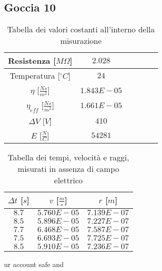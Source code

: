 \documentclass{article}
\begin{document}
\subsection{Goccia 10}
\begin{multicols}{2}

\begin{table}[H]
	\centering
	\begin{tabular}{| c | c | c | c | c | c |}
		\hline
		Resistenza [$M\Omega$] & $2.028$\\
		\hline
		Temperatura [$^\circ C$]& $24$\\
		\hline
		$\eta$ [$\frac{Ns}{m^2}$] & $1.843E-05$\\
		\hline
		$\eta_{eff}$ [$\frac{Ns}{m^2}$] & $1.661E-05$\\
		\hline
		$\Delta V$ [$V$] & $410$\\
		\hline
		$E$ [$\frac N C$] & $54281$\\
		\hline
	\end{tabular}
	\caption{Tabella dei valori costanti all'interno della misurazione}
	\label{}
\end{table}

\columnbreak

\begin{table}[H]
	\centering
	\begin{tabular}{| c | c | c |}
		\hline
		$\Delta t$ [$s$] & $v$ [$\frac ms$] & $r$ [$m$] \\
		\hline
		$8.7$ & $5.760E-05$ & $7.139E-07$ \\
		$8.5$ & $5.896E-05$ & $7.227E-07$ \\
		$7.7$ & $6.468E-05$ & $7.587E-07$ \\
		$7.5$ & $6.693E-05$ & $7.725E-07$ \\
		$8.5$ & $5.910E-05$ & $7.236E-07$ \\
		\hline
	\end{tabular}
	\caption{Tabella dei tempi, velocità e raggi, misurati in assenza di campo elettrico}
	\label{}
\end{table}ur account safe and
	
\end{multicols}
\end{document}
